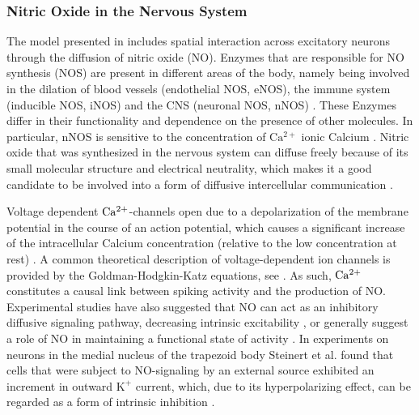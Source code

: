 \documentclass[10pt,a4paper]{article}
\begin{document}
\subsubsection{Nitric Oxide in the Nervous System}\label{NO_Experiments_Section}
The model presented in \cite{Sweeney_Paper} includes spatial interaction across excitatory neurons through the diffusion of nitric oxide (NO). Enzymes that are responsible for NO synthesis (NOS) are present in different areas of the body, namely being involved in the dilation of blood vessels (endothelial NOS, eNOS), the immune system (inducible NOS, iNOS) and the CNS (neuronal NOS, nNOS) \cite{NOS_Mammals}. These Enzymes differ in their functionality and dependence on the presence of other molecules. In particular, nNOS is sensitive to the concentration of $\mathrm{Ca^{2+}}$ ionic Calcium \cite{Knowles_Ca_nNOS,Steinert_NO}. Nitric oxide that was synthesized in the nervous system can diffuse freely because of its small molecular structure and electrical neutrality, which makes it a good candidate to be involved into a form of diffusive intercellular communication \cite{Lancaster_1994}. 

Voltage dependent $\rm Ca^{2+}$-channels open due to a depolarization of the membrane potential in the course of an action potential, which causes a significant increase of the intracellular Calcium concentration (relative to the low concentration at rest) \cite[p.~98--100]{Hille_Ion_Channels}. A common theoretical description of voltage-dependent ion channels is provided by the Goldman-Hodgkin-Katz equations, see \cite[p.~445--451]{Hille_Ion_Channels}. As such, $\rm Ca^{2+}$ constitutes a causal link between spiking activity and the production of NO. Experimental studies have also suggested that NO can act as an inhibitory diffusive signaling pathway, decreasing intrinsic excitability \cite{Steinert_NO_2011}, or generally suggest a role of NO in maintaining a functional state of activity \cite{Pape_NO}. In experiments on neurons in the medial nucleus of the trapezoid body Steinert et al. found that cells that were subject to NO-signaling by an external source exhibited an increment in outward $\mathrm{K^+}$ current, which, due to its hyperpolarizing effect, can be regarded as a form of intrinsic inhibition \cite{Steinert_NO}. 
\end{document}
